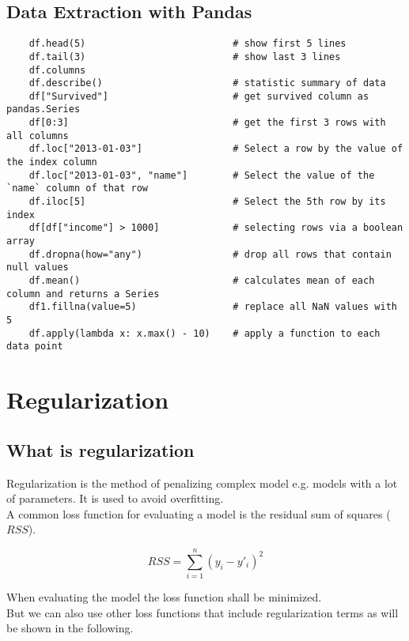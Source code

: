 \subsection{Data Extraction with Pandas}

\begin{lstlisting}
    df.head(5)                          # show first 5 lines
    df.tail(3)                          # show last 3 lines
    df.columns              
    df.describe()                       # statistic summary of data
    df["Survived"]                      # get survived column as pandas.Series
    df[0:3]                             # get the first 3 rows with all columns
    df.loc["2013-01-03"]                # Select a row by the value of the index column
    df.loc["2013-01-03", "name"]        # Select the value of the `name` column of that row
    df.iloc[5]                          # Select the 5th row by its index
    df[df["income"] > 1000]             # selecting rows via a boolean array
    df.dropna(how="any")                # drop all rows that contain null values
    df.mean()                           # calculates mean of each column and returns a Series
    df1.fillna(value=5)                 # replace all NaN values with 5
    df.apply(lambda x: x.max() - 10)    # apply a function to each data point
\end{lstlisting}


\section{Regularization}

\label{sec:regularization}

\subsection{What is regularization}
Regularization is the method of penalizing complex model e.g. models with a lot of parameters. It is used to avoid overfitting.\\

A common loss function for evaluating a model is the residual sum of squares ($RSS$).

$$
    RSS = \sum_{i=1}^{n} (y_{i} - y'_{i})^{2}
$$

When evaluating the model the loss function shall be minimized.\\
But we can also use other loss functions that include regularization terms as will be shown in the following.

